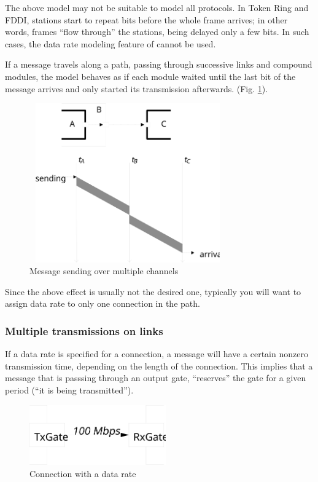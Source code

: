 The above model may not be suitable to model all protocols. In Token Ring
and FDDI, stations start to repeat bits before the whole frame arrives;
in other words, frames ``flow through'' the stations, being delayed only a few bits.
In such cases, the data rate modeling feature of {\opp} cannot be used.

If a message travels along a path, passing through successive links and
compound modules, the model behaves as if each module waited until the
last bit of the message arrives and only started its transmission
afterwards.
(Fig. \ref{fig:ch-overview:msg-multiple-ch}).

\begin{figure}[htbp]
\begin{center}
\includegraphics[width=3.330in, height=2.692in]{figures/simple-messagesend}
\caption{Message sending over multiple channels}
\label{fig:ch-overview:msg-multiple-ch}
\end{center}
\end{figure}

Since the above effect is usually not the desired one, typically
you will want to assign data rate to only one connection in the
path.


\subsubsection{Multiple transmissions on links}

If a data rate is specified for a connection, a message
will have a certain nonzero transmission time, depending on the length of the connection. This implies that
a message that is passsing through an output gate, ``reserves'' the gate
for a given period (``it is being transmitted'').

\begin{figure}[htbp]
  \begin{center}
    \includegraphics[width=2.315in, height=1.015in]{figures/simple-conndatarate}
    \caption{Connection with a data rate}
    \label{fig:ch-simple-modules:conn-w-data-rate}
  \end{center}
\end{figure}

